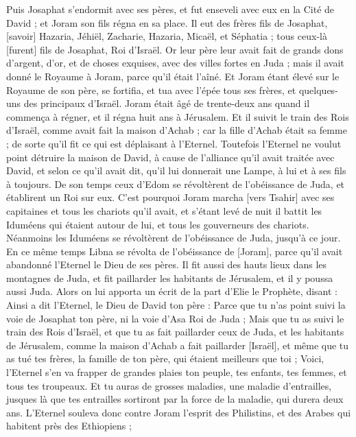 \begin{multicols}{2}
\VerseOne{}Puis Josaphat s'endormit avec ses pères, et fut enseveli avec eux en la Cité de David ; et Joram son fils régna en sa place.
Il eut des frères fils de Josaphat, [savoir] Hazaria, Jéhiël, Zacharie, Hazaria, Micaël, et Séphatia ; tous ceux-là [furent] fils de Josaphat, Roi d'Israël.
Or leur père leur avait fait de grands dons d'argent, d'or, et de choses exquises, avec des villes fortes en Juda ; mais il avait donné le Royaume à Joram, parce qu'il était l'aîné.
Et Joram étant élevé sur le Royaume de son père, se fortifia, et tua avec l'épée tous ses frères, et quelques-uns des principaux d'Israël.
Joram était âgé de trente-deux ans quand il commença à régner, et il régna huit ans à Jérusalem.
Et il suivit le train des Rois d'Israël, comme avait fait la maison d'Achab ; car la fille d'Achab était sa femme ; de sorte qu'il fit ce qui est déplaisant à l'Eternel.
Toutefois l'Eternel ne voulut point détruire la maison de David, à cause de l'alliance qu'il avait traitée avec David, et selon ce qu'il avait dit, qu'il lui donnerait une Lampe, à lui et à ses fils à toujours.
De son temps ceux d'Edom se révoltèrent de l'obéissance de Juda, et établirent un Roi sur eux.
C'est pourquoi Joram marcha [vers Tsahir] avec ses capitaines et tous les chariots qu'il avait, et s'étant levé de nuit il battit les Iduméens qui étaient autour de lui, et tous les gouverneurs des chariots.
Néanmoins les Iduméens se révoltèrent de l'obéissance de Juda, jusqu'à ce jour. En ce même temps Libna se révolta de l'obéissance de [Joram], parce qu'il avait abandonné l'Eternel le Dieu de ses pères.
Il fit aussi des hauts lieux dans les montagnes de Juda, et fit paillarder les habitants de Jérusalem, et il y poussa aussi Juda.
Alors on lui apporta un écrit de la part d'Elie le Prophète, disant : Ainsi a dit l'Eternel, le Dieu de David ton père : Parce que tu n'as point suivi la voie de Josaphat ton père, ni la voie d'Asa Roi de Juda ;
Mais que tu as suivi le train des Rois d'Israël, et que tu as fait paillarder ceux de Juda, et les habitants de Jérusalem, comme la maison d'Achab a fait paillarder [Israël], et même que tu as tué tes frères, la famille de ton père, qui étaient meilleurs que toi ;
Voici, l'Eternel s'en va frapper de grandes plaies ton peuple, tes enfants, tes femmes, et tous tes troupeaux.
Et tu auras de grosses maladies, une maladie d'entrailles, jusques là que tes entrailles sortiront par la force de la maladie, qui durera deux ans.
L'Eternel souleva donc contre Joram l'esprit des Philistins, et des Arabes qui habitent près des Ethiopiens ;

\end{multicols}
